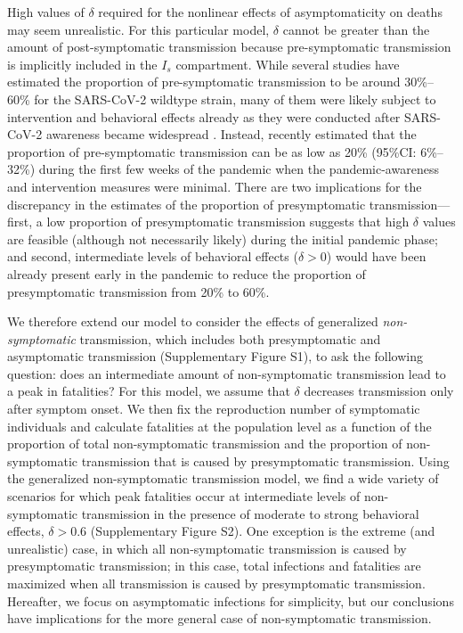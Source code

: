 \documentclass[12pt]{article}
\begin{document}
High values of $\delta$ required for the nonlinear effects of asymptomaticity on deaths may seem unrealistic.
For this particular model, $\delta$ cannot be greater than the amount of post-symptomatic transmission because pre-symptomatic transmission is implicitly included in the $I_s$ compartment.
While several studies have estimated the proportion of pre-symptomatic transmission to be around 30\%--60\% for the SARS-CoV-2 wildtype strain, many of them were likely subject to intervention and behavioral effects already as they were conducted after SARS-CoV-2 awareness became widespread \citep{he2020temporal}.
Instead, \cite{sender2021unmitigated} recently estimated that the proportion of pre-symptomatic transmission can be as low as 20\% (95\%CI: 6\%--32\%) during the first few weeks of the pandemic when the pandemic-awareness and intervention measures were minimal.
There are two implications for the discrepancy in the estimates of the proportion of presymptomatic transmission---first, a low proportion of presymptomatic transmission suggests that high $\delta$ values are feasible (although not necessarily likely) during the initial pandemic phase; and second, intermediate levels of behavioral effects ($\delta > 0$) would have been already present early in the pandemic to reduce the proportion of presymptomatic transmission from 20\% to 60\%.

We therefore extend our model to consider the effects of generalized \textit{non-symptomatic} transmission, which includes both presymptomatic and asymptomatic transmission (Supplementary Figure S1), to ask the following question:
does an intermediate amount of non-symptomatic transmission lead to a peak in fatalities?
For this model, we assume that $\delta$ decreases transmission only after symptom onset.
We then fix the reproduction number of symptomatic individuals and calculate fatalities at the population level as a function of the proportion of total non-symptomatic transmission and the proportion of non-symptomatic transmission that is caused by presymptomatic transmission.
Using the generalized non-symptomatic transmission model, we find a wide variety of scenarios for which peak fatalities occur at intermediate levels of non-symptomatic transmission in the presence of moderate to strong behavioral effects, $\delta > 0.6$ (Supplementary Figure S2).
One exception is the extreme (and unrealistic) case, in which all non-symptomatic transmission is caused by presymptomatic transmission;
in this case, total infections and fatalities are maximized when all transmission is caused by presymptomatic transmission.
Hereafter, we focus on asymptomatic infections for simplicity, but our conclusions have implications for the more general case of non-symptomatic transmission.
\end{document}
